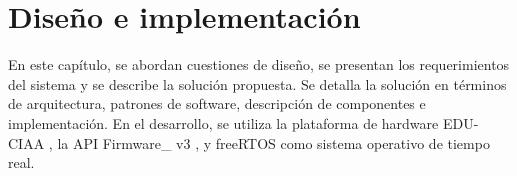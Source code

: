 \chapter{Diseño e implementación} %
\label{Chapter3} %

En este capítulo, se abordan cuestiones de diseño, se presentan los requerimientos del sistema y se describe la solución propuesta. Se detalla la solución en términos de arquitectura, patrones de software, descripción de componentes e implementación. En el desarrollo, se utiliza la plataforma de hardware EDU-CIAA \citep{CIAA}, la API Firmware\_ v3 \citep{firmwarev3}, y freeRTOS \citep{freeRTOS} como sistema operativo de tiempo real.\\




